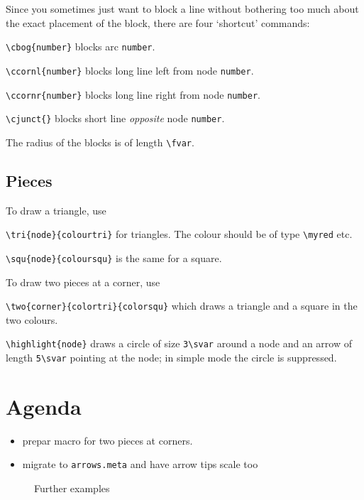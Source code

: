\documentclass[a5paper]{scrartcl}
\begin{document}
Since you sometimes just want to block a line without bothering too much about the exact placement of the block, there are four `shortcut' commands:

\verb|\cbog{number}| blocks arc \verb|number|.

\verb|\ccornl{number}| blocks long line left from node  \verb|number|.

\verb|\ccornr{number}| blocks long line right from node  \verb|number|.

\verb|\cjunct{}| blocks short line \emph{opposite} node  \verb|number|.

The radius of the blocks is of length \verb|\fvar|.

\subsection*{Pieces}

To draw a triangle, use

\verb|\tri{node}{colourtri}| for triangles. The colour should be of type \verb|\myred| etc.

\verb|\squ{node}{coloursqu}| is the same for a square. 

To draw two pieces at a corner, use

\verb|\two{corner}{colortri}{colorsqu}| which draws a triangle and a square in the two colours.



\subtitle{Extras}

\verb|\highlight{node}| draws a circle of size \verb|3\svar| around a node and an arrow of length \verb|5\svar| pointing at the node; in simple mode the circle is suppressed.

\section*{Agenda}
\begin{itemize}
    \item prepar macro for two pieces at corners.
    \item migrate to \verb|arrows.meta| and have arrow tips scale too
\end{itemize}

\begin{figure}
    \centering
    
    \caption{Further examples}
    \label{fig:furtherexamples}
\end{figure}
\end{document}
